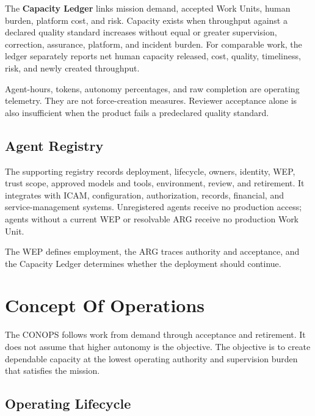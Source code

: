 \documentclass[11pt]{article}
\begin{document}
The \textbf{Capacity Ledger} links mission demand, accepted Work Units,
human burden, platform cost, and risk. Capacity exists when throughput
against a declared quality standard increases without equal or greater
supervision, correction, assurance, platform, and incident burden. For
comparable work, the ledger separately reports net human capacity
released, cost, quality, timeliness, risk, and newly created throughput.

Agent-hours, tokens, autonomy percentages, and raw completion are
operating telemetry. They are not force-creation measures. Reviewer
acceptance alone is also insufficient when the product fails a
predeclared quality standard.

\hypertarget{44-agent-registry}{%
\subsection{Agent Registry}\label{44-agent-registry}}

The supporting registry records deployment, lifecycle, owners, identity,
WEP, trust scope, approved models and tools, environment, review, and
retirement. It integrates with ICAM, configuration, authorization,
records, financial, and service-management systems. Unregistered agents
receive no production access; agents without a current WEP or resolvable
ARG receive no production Work Unit.

The WEP defines employment, the ARG traces authority and acceptance, and
the Capacity Ledger determines whether the deployment should continue.

\hypertarget{5-concept-of-operations}{%
\section{Concept Of Operations}\label{5-concept-of-operations}}

The CONOPS follows work from demand through acceptance and retirement.
It does not assume that higher autonomy is the objective. The objective
is to create dependable capacity at the lowest operating authority and
supervision burden that satisfies the mission.

\hypertarget{51-operating-lifecycle}{%
\subsection{Operating Lifecycle}\label{51-operating-lifecycle}}
\end{document}
